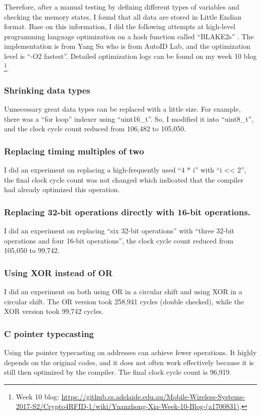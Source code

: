 \documentclass[sigconf, review=false]{acmart}
\begin{document}
Therefore, after a manual testing by defining different types of variables and checking the memory states,
I found that all data are stored in Little Endian format.
Base on this information, I did the following attempts at high-level programming language optimization
on a hash function called ``BLAKE2s'' \cite{aumasson2016blake2x}.
The implementation is from Yang Su who is from AutoID Lab, and the optimization level is ``-O2 fastest''.
Detailed optimization logs can be found on my week 10 blog
\footnote{Week 10 blog: \url{https://github.cs.adelaide.edu.au/Mobile-Wireless-Systems-2017-S2/Crypto4RFID-1/wiki/Yuanzhong-Xia-Week-10-Blog-(a1700831)}.}.

\subsubsection{Shrinking data types}
Unnecessary great data types can be replaced with a little size.
For example, there was a ``for loop'' indexer using ``uint16\_t''.
So, I modified it into ``uint8\_t'', and the clock cycle count reduced from 106,482 to 105,050.

\subsubsection{Replacing timing multiples of two}
I did an experiment on replacing a high-frequently used ``4 * i'' with ``i << 2'',
the final clock cycle count was not changed which indicated that the compiler had already optimized this operation.

\subsubsection{Replacing 32-bit operations directly with 16-bit operations.}
I did an experiment on replacing ``six 32-bit operations'' with ``three 32-bit operations and four 16-bit operations'',
the clock cycle count reduced from 105,050 to 99,742.

\subsubsection{Using XOR instead of OR}
I did an experiment on both using OR in a circular shift and using XOR in a circular shift.
The OR version took 258,941 cycles (double checked), while the XOR version took 99,742 cycles.

\subsubsection{C pointer typecasting}
Using the pointer typecasting on addresses can achieve fewer operations.
It highly depends on the original codes, and it does not often work effectively because it is still then optimized by the compiler.
The final clock cycle count is 96,919.
\end{document}
